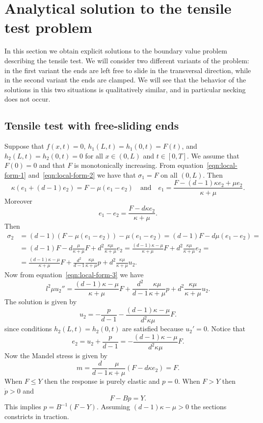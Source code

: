 \documentclass[a4paper,10pt,twoside]{amsbook}
\numberwithin{section}{chapter}
\numberwithin{equation}{chapter}
\theoremstyle{definition}
\begin{document}
\section{Analytical solution to the tensile test problem}

In this section we obtain explicit solutions to the boundary value problem describing the tensile test. We will consider two different variants of the problem: in the first variant the ends are left free to slide in the transversal direction, while in the second variant the ends are clamped. We will see that the behavior of the solutions in this two situations is qualitatively similar, and in particular necking does not occur.

\subsection{Tensile test with free-sliding ends}
\label{subsec:homogeneous-solution}

Suppose that $f(x,t)=0$, $h_1(L,t)=h_1(0,t)=F(t)$, and $h_2(L,t)=h_2(0,t)=0$ for all $x\in(0,L)$ and $t\in[0,T]$. We assume that $F(0)=0$ and that $F$ is monotonically increasing. From equation~\eqref{eqn:local-form-1} and~\eqref{eqn:local-form-2} we have that $\sigma_1=F$ on all $(0,L)$. Then
\[
\kappa(e_1+(d-1)e_2)=F-\mu(e_1-e_2)\quad\text{and}\quad e_1=\frac{F-(d-1)\kappa e_2+\mu e_2}{\kappa+\mu}.
\]
Moreover
\[
e_1-e_2=\frac{F-d\kappa e_2}{\kappa+\mu}.
\]
Then
\[
\begin{split}
\sigma_2&=(d-1)\left(F-\mu(e_1-e_2)\right)-\mu(e_1-e_2)=(d-1)F-d\mu(e_1-e_2)=\\
&=(d-1)F-d\frac{\mu}{\kappa+\mu}F+d^2\frac{\kappa\mu}{\kappa+\mu}e_2=\frac{(d-1)\kappa-\mu}{\kappa+\mu}F+d^2\frac{\kappa\mu}{\kappa+\mu}e_2=\\
&=\frac{(d-1)\kappa-\mu}{\kappa+\mu}F+\frac{d^2}{d-1}\frac{\kappa\mu}{\kappa+\mu}p+d^2\frac{\kappa\mu}{\kappa+\mu}u_2.
\end{split}
\]
Now from equation~\eqref{eqn:local-form-3} we have
\[
l^2\mu u_2''=\frac{(d-1)\kappa-\mu}{\kappa+\mu}F+\frac{d^2}{d-1}\frac{\kappa\mu}{\kappa+\mu}p+d^2\frac{\kappa\mu}{\kappa+\mu}u_2.
\]
The solution is given by
\[
u_2=-\frac{p}{d-1}-\frac{(d-1)\kappa-\mu}{d^2\kappa\mu}F.
\]
since conditions $h_2(L,t)=h_2(0,t)$ are satisfied because $u_2'=0$. Notice that
\[
e_2=u_2+\frac{p}{d-1}=-\frac{(d-1)\kappa-\mu}{d^2\kappa\mu}F.
\]
Now the Mandel stress is given by
\[
m=\frac{d}{d-1}\frac{\mu}{\kappa+\mu}(F-d\kappa e_2)=F.
\]
When $F\le Y$ then the response is purely elastic and $p=0$. When $F>Y$ then $\dot p>0$ and
\[
F-Bp=Y.
\]
This implies $p=B^{-1}(F-Y)$. Assuming $(d-1)\kappa-\mu>0$ the sections constricts in traction.
\end{document}
